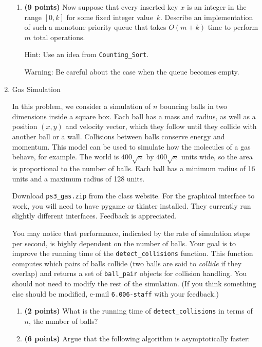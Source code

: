 \documentclass[12pt,twoside]{article}
\begin{document}
\begin{enumerate}
\begin{enumerate}
\item {\bf (9 points)}
Now suppose that every inserted key $x$ is an integer
in the range $[0,k]$ for some fixed integer value~$k$.
Describe an implementation of such a monotone priority queue
that takes $O(m + k)$ time to perform $m$ total operations. 

Hint: Use an idea from \texttt{Counting\_Sort}.

Warning: Be careful about the case when the queue becomes empty.

\end{enumerate}

\item Gas Simulation

  In this problem, we consider a simulation of $n$ bouncing balls in
  two dimensions inside a square box.  Each ball has a mass and
  radius, as well as a position $(x,y)$ and velocity vector, which
  they follow until they collide with another ball or a wall.
  Collisions between balls conserve energy and momentum.  This model
  can be used to simulate how the molecules of a gas behave, for
  example.  The world is $400\sqrt{n}$ by $400\sqrt{n}$ units wide, so
  the area is proportional to the number of balls. Each ball has a
  minimum radius of 16 units and a maximum radius of 128 units.

  Download \texttt{ps3\_gas.zip} from the class website. For the
  graphical interface to work, you will need to have pygame or tkinter
  installed. They currently run slightly different
  interfaces. Feedback is appreciated.

  You may notice that performance, indicated by the rate of simulation steps
  per second, is highly dependent on the number of balls.  Your
  goal is to improve the running time of the
  \texttt{detect\_collisions} function.  This function computes which pairs of
  balls collide (two balls are said to \emph{collide} if they overlap) and
  returns a set of \texttt{ball\_pair} objects for collision
  handling. You should not need to modify the rest of the simulation.
  (If you think something else should be modified, e-mail
  \texttt{6.006-staff} with your feedback.)

  \begin{enumerate}

    \item {\bf (2 points)} What is the running time of
    \texttt{detect\_collisions} in terms of $n$, the number of balls?


    \item {\bf (6 points)} Argue that the following algorithm is
    asymptotically faster:
    

\end{enumerate}
\end{enumerate}
\end{document}
